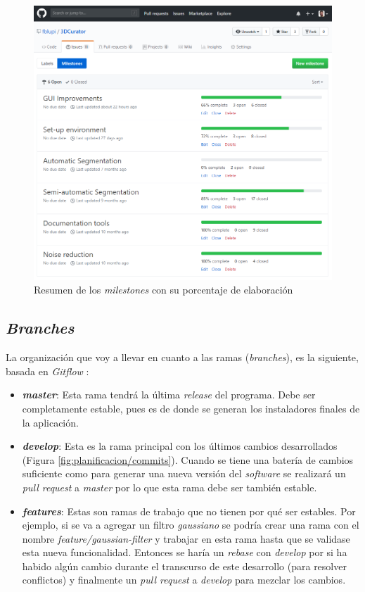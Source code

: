 \begin{figure}[H]
	\centering
	\includegraphics[width=12cm]{imagenes/planificacion/milestones}
	\caption{Resumen de los \textit{milestones} con su porcentaje de elaboración}
	\label{fig:planificacion/milestones}
\end{figure}

\subsection{\textit{Branches}}

La organización que voy a llevar en cuanto a las ramas (\textit{branches}), es la siguiente, basada en \textit{Gitflow} \cite{gitflow}:

\begin{itemize}
	\item \textbf{\textit{master}}: Esta rama tendrá la última \textit{release} del programa. Debe ser completamente estable, pues es de donde se generan los instaladores finales de la aplicación.
	\item \textbf{\textit{develop}}: Esta es la rama principal con los últimos cambios desarrollados (Figura \ref{fig:planificacion/commits}). Cuando se tiene una batería de cambios suficiente como para generar una nueva versión del \textit{software} se realizará un \textit{pull request} a \textit{master} por lo que esta rama debe ser también estable.
	\item \textbf{\textit{features}}: Estas son ramas de trabajo que no tienen por qué ser estables. Por ejemplo, si se va a agregar un filtro \textit{gaussiano} se podría crear una rama con el nombre \textit{feature/gaussian-filter} y trabajar en esta rama hasta que se validase esta nueva funcionalidad. Entonces se haría un \textit{rebase} con \textit{develop} por si ha habido algún cambio durante el transcurso de este desarrollo (para resolver conflictos) y finalmente un \textit{pull request} a \textit{develop} para mezclar los cambios.
\end{itemize}

